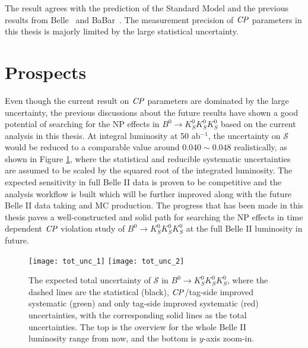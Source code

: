 The result agrees with the prediction of the Standard Model and the previous results from Belle~\cite{kang2020measurement} and BaBar~\cite{Lees:2011nf}. The measurement precision of $\it{CP}$ parameters in this thesis is majorly limited by the large statistical uncertainty.


\section{Prospects}
Even though the current result on $\it{CP}$ parameters are dominated by the large uncertainty, the previous discussions about the future results have shown a good potential of searching for the NP effects in $B^0 \to K_S^0  K_S^0  K_S^0$ based on the current analysis in this thesis. At integral luminosity at 50 ab$^{-1}$, the uncertainty on $\mathcal{S}$ would be reduced to a comparable value around $0.040\sim0.048$ realistically, as shown in Figure \ref{fig:tot_exp}{\protect\footnotemark}, where the statistical and reducible systematic uncertainties are assumed to be scaled by the squared root of the integrated luminosity. The expected sensitivity in full Belle II data is proven to be competitive and the analysis workflow is built which will be further improved along with the future Belle II data taking and MC production. The progress that has been made in this thesis paves a well-constructed and solid path for searching the NP effects in time dependent $\it{CP}$ violation study of $B^0 \to K_S^0  K_S^0  K_S^0$ at the full Belle II luminosity in future.
 
\begin{figure}[htpb]
	\centering
	\texttt{[image: tot\_unc\_1]}
	\hspace*{1.5cm}\texttt{[image: tot\_unc\_2]}
	\caption{The expected total uncertainty of $\mathcal{S}$ in $B^0 \to K_S^0  K_S^0  K_S^0$, where the dashed lines are the statistical (black), $\it{CP}$/tag-side improved systematic (green) and only tag-side improved systematic (red) uncertainties, with the corresponding solid lines as the total uncertainties. The top is the overview for the whole Belle II luminosity range from now, and the bottom is $y$-axis zoom-in. }
	\label{fig:tot_exp}
\end{figure}
